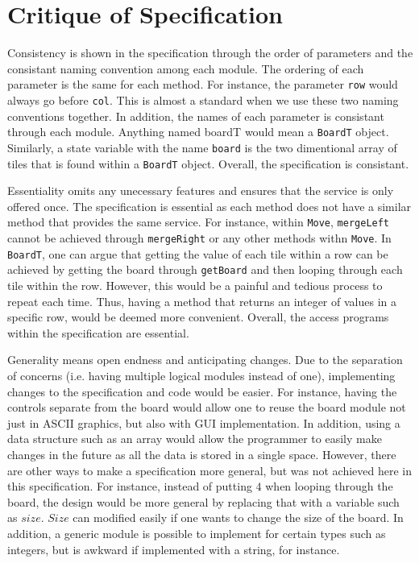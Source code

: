 \documentclass[12pt]{article}
\begin{document}
\section*{Critique of Specification}

Consistency is shown in the specification through the order of parameters and the consistant naming convention among each module. The ordering of each parameter is the same for each method. For instance, the parameter \verb|row| would always go before \verb|col|. This is almost a standard when we use these two naming conventions together.  In addition, the names of each parameter is consistant through each module. Anything named boardT would mean a \verb|BoardT| object. Similarly, a state variable with the name \verb|board| is the two dimentional array of tiles that is found within a \verb|BoardT| object. Overall, the specification is consistant.

Essentiality omits any unecessary features and ensures that the service is only offered once. The specification is essential as each method does not have a similar method that provides the same service. For instance, within \verb|Move|, \verb|mergeLeft| cannot be achieved through \verb|mergeRight| or any other methods withn \verb|Move|. In \verb|BoardT|, one can argue that getting the value of each tile within a row can be achieved by getting the board through \verb|getBoard| and then looping through each tile within the row. However, this would be a painful and tedious process to repeat each time. Thus, having a method that returns an integer of values in a specific row, would be deemed more convenient. Overall, the access programs within the specification are essential. 


Generality means open endness and anticipating changes. Due to the separation of concerns (i.e. having multiple logical modules instead of one), implementing changes to the specification and code would be easier. For instance, having the controls separate from the board would allow one to reuse the board module not just in ASCII graphics, but also with GUI implementation. In addition, using a data structure such as an array would allow the programmer to easily make changes in the future as all the data is stored in a single space. However, there are other ways to make a specification more general, but was not achieved here in this specification. For instance, instead of putting $4$ when looping through the board, the design would be more general by replacing that with a variable such as $size$. $Size$ can modified easily if one wants to change the size of the board. In addition, a generic module is possible to implement for certain types such as integers, but is awkward if implemented with a string, for instance. 
\end{document}
